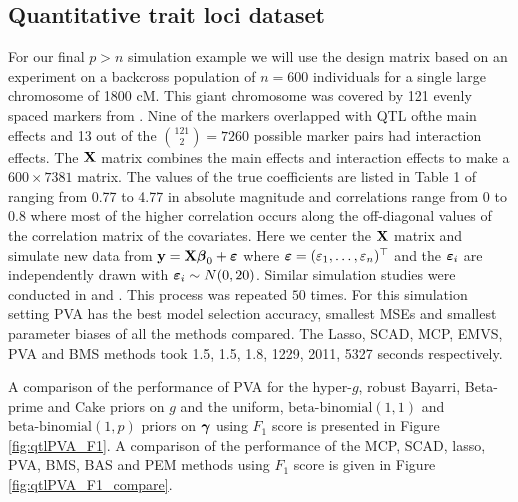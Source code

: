 \subsection{Quantitative trait loci dataset}
\label{sec:QTL}

	For our final $p>n$ simulation example we will use the design matrix based on an
experiment on a backcross population of $n=600$ individuals for a single large 
chromosome of 1800 cM. This giant chromosome was covered by 121 evenly 
spaced markers from \cite{Xu2007}. Nine of the markers overlapped with QTL ofthe main effects 
and 13 out of the ${121 \choose 2} = 7260$ possible marker pairs had interaction 
effects. The ${\bf X}$ matrix combines the main effects and interaction effects to
make a $600\times 7381$ matrix. The values of the true coefficients are listed in 
Table 1 of \cite{Xu2007} ranging from 0.77 to 4.77 in absolute magnitude and
correlations range from 0 to 0.8 where most of the higher correlation occurs
along the off-diagonal values of the correlation matrix of the covariates. Here
we center the ${\bf X}$ matrix and simulate new data from ${\bf y} = {\bf X}{\boldsymbol \beta}_0 + {\boldsymbol \varepsilon}$
where ${\boldsymbol \varepsilon} = (\varepsilon_1,\ldots,\varepsilon_n)^\top$ and the ${\boldsymbol \varepsilon}_i$
are independently drawn with ${\boldsymbol \varepsilon}_i \sim N(0,20)$. Similar simulation
studies were conducted in \cite{Xu2007} and \cite{Karkkainen2012}. This
process was repeated $50$ times.
For this simulation setting PVA has the best model selection accuracy,
smallest MSEs and smallest parameter biases of all the methods compared.
The Lasso, SCAD, MCP, EMVS, PVA and BMS methods took 1.5, 1.5, 1.8, 1229, 2011, 5327
seconds respectively.

A comparison of the performance of PVA for the hyper-$g$, robust Bayarri, Beta-prime and Cake priors on $g$
and the uniform, $\text{beta-binomial}(1, 1)$ and $\text{beta-binomial}(1, p)$ priors on ${\boldsymbol \gamma}$ using $F_1$
score is presented in Figure \ref{fig:qtlPVA_F1}. A comparison of the performance of the MCP, SCAD, lasso,
PVA, BMS, BAS and PEM  methods using $F_1$ score is given in Figure \ref{fig:qtlPVA_F1_compare}.

